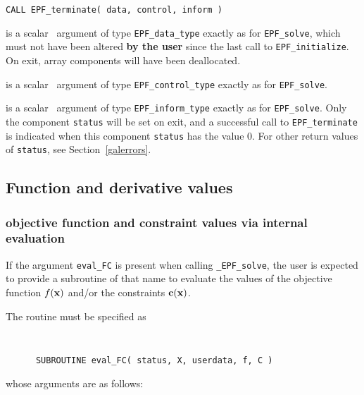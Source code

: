 \documentclass{galahad}
\newcommand{\packagename}{EPF}
\newcommand{\fullpackagename}{\libraryname\_\packagename}
\newcommand{\solver}{{\tt \fullpackagename\_solve}}
\begin{document}
\hspace{8mm}
{\tt CALL \packagename\_terminate( data, control, inform )}

\vspace*{-1mm}
\begin{description}

 is a scalar \intentinout\ argument of type
{\tt \packagename\_data\_type}
exactly as for
{\tt \packagename\_solve},
which must not have been altered {\bf by the user} since the last call to
{\tt \packagename\_initialize}.
On exit, array components will have been deallocated.

 is a scalar \intentin\ argument of type
{\tt \packagename\_control\_type}
exactly as for
{\tt \packagename\_solve}.

 is a scalar \intentout\ argument of type
{\tt \packagename\_inform\_type}
exactly as for
{\tt \packagename\_solve}.
Only the component {\tt status} will be set on exit, and a
successful call to
{\tt \packagename\_terminate}
is indicated when this  component {\tt status} has the value 0.
For other return values of {\tt status}, see Section~\ref{galerrors}.

\end{description}


\subsection{Function and derivative values\label{fdv}}


\subsubsection{objective function and constraint values via internal evaluation\label{fcfv}}

If the argument {\tt eval\_FC} is present when calling \solver, the
user is expected to provide a subroutine of that name to evaluate the
values of the objective function $f({\mathbf{x}})$ and/or the constraints ${\mathbf{c}}({\mathbf{x}})$.

The routine must be specified as

\def\baselinestretch{0.8}
{\tt
\begin{verbatim}
      SUBROUTINE eval_FC( status, X, userdata, f, C )
\end{verbatim}
}
\def\baselinestretch{1.0}
\noindent whose arguments are as follows:
\end{document}
